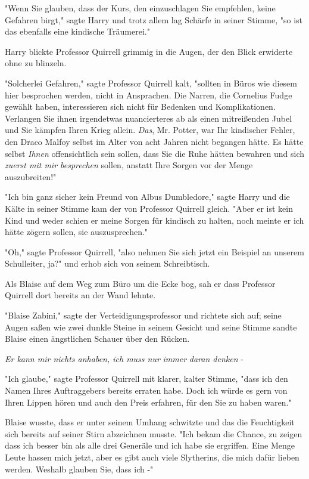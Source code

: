 {"Wenn Sie glauben, dass der Kurs, den einzuschlagen Sie empfehlen, keine Gefahren birgt," sagte Harry und trotz allem lag Schärfe in seiner Stimme, "so ist das ebenfalls eine kindische Träumerei."

Harry blickte Professor Quirrell grimmig in die Augen, der den Blick erwiderte ohne zu blinzeln.

"Solcherlei Gefahren," sagte Professor Quirrell kalt, "sollten in Büros wie diesem hier besprochen werden, nicht in Ansprachen. Die Narren, die Cornelius Fudge gewählt haben, interessieren sich nicht für Bedenken und Komplikationen. Verlangen Sie ihnen irgendetwas nuancierteres ab als einen mitreißenden Jubel und Sie kämpfen Ihren Krieg allein. \emph{Das}, Mr. Potter, war Ihr kindischer Fehler, den Draco Malfoy selbst im Alter von acht Jahren nicht begangen hätte. Es hätte selbst \emph{Ihnen} offensichtlich sein sollen, dass Sie die Ruhe hätten bewahren und sich \emph{zuerst mit mir besprechen} sollen, anstatt Ihre Sorgen vor der Menge auszubreiten!"

"Ich bin ganz sicher kein Freund von Albus Dumbledore," sagte Harry und die Kälte in seiner Stimme kam der von Professor Quirrell gleich. "Aber er ist kein Kind und weder schien er meine Sorgen für kindisch zu halten, noch meinte er ich hätte zögern sollen, sie auszusprechen."

"Oh," sagte Professor Quirrell, "also nehmen Sie sich jetzt ein Beispiel an unserem Schulleiter, ja?" und erhob sich von seinem Schreibtisch.

\later

Als Blaise auf dem Weg zum Büro um die Ecke bog, sah er dass Professor Quirrell dort bereits an der Wand lehnte.

"Blaise Zabini," sagte der Verteidigungsprofessor und richtete sich auf; seine Augen saßen wie zwei dunkle Steine in seinem Gesicht und seine Stimme sandte Blaise einen ängstlichen Schauer über den Rücken.

\emph{Er kann mir nichts anhaben, ich muss nur} \emph{immer} \emph{daran denken} -

"Ich glaube," sagte Professor Quirrell mit klarer, kalter Stimme, "dass ich den Namen Ihres Auftraggebers bereits erraten habe. Doch ich würde es gern von Ihren Lippen hören und auch den Preis erfahren, für den Sie zu haben waren."

Blaise wusste, dass er unter seinem Umhang schwitzte und das die Feuchtigkeit sich bereits auf seiner Stirn abzeichnen musste. "Ich bekam die Chance, zu zeigen dass ich besser bin als alle drei Generäle und ich habe sie ergriffen. Eine Menge Leute hassen mich jetzt, aber es gibt auch viele Slytherins, die mich dafür lieben werden. Weshalb glauben Sie, dass ich -"

}
